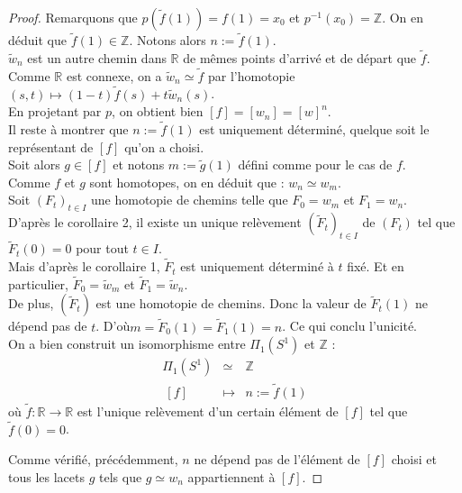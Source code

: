 \begin{proof}
			Remarquons que $p(\tilde{f}(1))=f(1)=x_{0}$ et $p^{-1}(x_{0})=\mathbb{Z}$. On en déduit que $\tilde{f}(1)\in\mathbb{Z}$. 
			Notons alors $n:=\tilde{f}(1)$.\\
			$\tilde{w}_{n}$ est un autre chemin dans $\mathbb{R}$ de mêmes points d'arrivé et de départ que $\tilde{f}$. 
			Comme $\mathbb{R}$ est connexe, on a $\tilde{w}_{n}\simeq\tilde{f}$ par l'homotopie 
			$(s,t)\mapsto(1-t)\tilde{f}(s)+t\tilde{w}_{n}(s)$.\\
			En projetant par $p$, on obtient bien $[f]=[w_{n}]=[w]^{n}$.\\
			Il reste à montrer que $n:=\tilde{f}(1)$ est uniquement déterminé, quelque soit le représentant de $[f]$ 
			qu'on a choisi.\\
			Soit alors $g\in[f]$ et notons $m:=\tilde{g}(1)$ défini comme pour le cas de $f$.\\
			Comme $f$ et $g$ sont homotopes, on en déduit que : $w_{n}\simeq w_{m}$.\\
			Soit $(F_{t})_{t\in I}$ une homotopie de chemins telle que $F_{0}=w_{m}$ et $F_{1}=w_{n}$.\\
			D'après le corollaire 2, il existe un unique relèvement $(\tilde{F}_{t})_{t\in I}$ de $(F_{t})$ tel que 
			$\tilde{F}_{t}(0)=0$ pour tout $t\in I$.\\ 
			Mais d'après le corollaire 1, $\tilde{F}_{t}$ est uniquement déterminé à $t$ fixé. Et en particulier, 
			$\tilde{F}_{0}=\tilde{w}_{m}$ et $\tilde{F}_{1}=\tilde{w}_{n}$.\\
			De plus, $(\tilde{F}_{t})$ est une homotopie de chemins. Donc la valeur de $\tilde{F}_{t}(1)$ ne dépend pas de $t$. 
			D'où\linebreak $m=\tilde{F}_{0}(1)=\tilde{F}_{1}(1)=n$. Ce qui conclu l'unicité.\\
			On a bien construit un isomorphisme entre $\Pi_{1}(S^{1})$ et $\mathbb{Z}$ :
			\[\begin{array}{ccl}
				\Pi_{1}(S^{1})	&	\simeq	&	\mathbb{Z}	\\~
				[f]				&	\mapsto	&	n:=\tilde{f}(1)
			\end{array}\]
			où $\tilde{f}:\mathbb{R}\longrightarrow\mathbb{R}$ est l'unique relèvement d'un certain élément de $[f]$ tel que 
			$\tilde{f}(0)=0$.
			
			Comme vérifié, précédemment, $n$ ne dépend pas de l'élément de $[f]$ choisi et tous les lacets $g$ tels que 
			$g\simeq w_{n}$ appartiennent à $[f]$.
		\end{proof}
